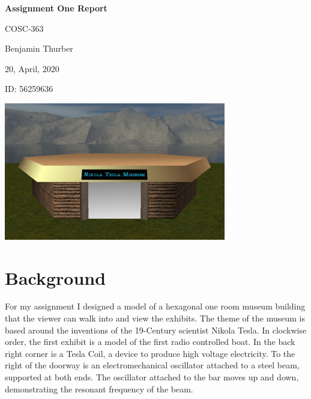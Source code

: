 \documentclass[10pt, oneside]{article}   	%
\begin{document}
\begin{center}
\LARGE{\textbf{Assignment One Report}}	%
\end{center}
\vspace{-1mm}
\begin{flushright}
\large{COSC-363}
\end{flushright}
\vspace{-11mm}
\large{Benjamin Thurber}			%
\vspace{0mm}
\begin{center}
\centerline{\large{20, April, 2020}}
\end{center}

\vspace{-10mm}
\begin{flushleft}
ID: 56259636

\end{flushleft}

\begin{center}
\vspace{2mm}
\includegraphics[height=6cm]{building.jpg}   %
\end{center}


\vspace{-3mm}
\normalsize

\section{Background}
For my assignment I designed a model of a hexagonal one room museum building that the viewer can walk into and view the exhibits.  The theme of the museum is based around the inventions of the 19-Century scientist Nikola Tesla.  In clockwise order, the first exhibit is a model of the first radio controlled boat.  In the back right corner is a Tesla Coil, a device to produce high voltage electricity.  To the right of the doorway is an electromechanical oscillator attached to a steel beam, supported at both ends.  The oscillator attached to the bar moves up and down, demonstrating the resonant frequency of the beam.
\end{document}

